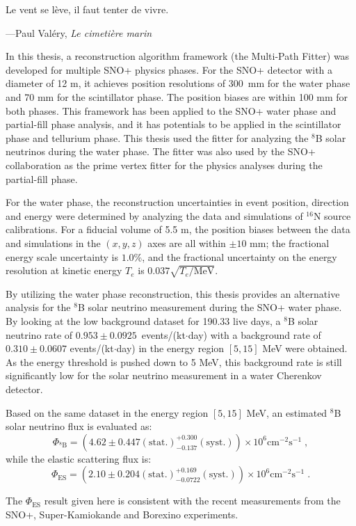 \epigraph{Le vent se l\`{e}ve, il faut tenter de vivre.}{---\textup{Paul Val\'{e}ry, \textit{Le cimeti\`{e}re marin}}}

In this thesis, a reconstruction algorithm framework (the Multi-Path Fitter) was developed for multiple SNO+ physics phases. For the SNO+ detector with a diameter of 12 m, it achieves position resolutions of 300~mm for the water phase and 70 mm for the scintillator phase. The position biases are within 100 mm for both phases. This framework has been applied to the SNO+ water phase and partial-fill phase analysis, and it has potentials to be applied in the scintillator phase and tellurium phase. This thesis used the fitter for analyzing the $^8$B solar neutrinos during the water phase. The fitter was also used by the SNO+ collaboration as the prime vertex fitter for the physics analyses during the partial-fill phase.

For the water phase, the reconstruction uncertainties in event position, direction and energy were determined by analyzing the data and simulations of $^{16}$N source calibrations. For a fiducial volume of 5.5 m, the position biases between the data and simulations in the $(x,y,z)$ axes are all within $\pm10$ mm; the fractional energy scale uncertainty is $1.0$\%, and the fractional uncertainty on the energy resolution at kinetic energy $T_e$ is $0.037\sqrt{T_e/\mathrm{MeV}}$.

By utilizing the water phase reconstruction, this thesis provides an alternative analysis for the $^8$B solar neutrino measurement during the SNO+ water phase. By looking at the low background dataset for 190.33 live days, a $^8$B solar neutrino rate of $0.953\pm0.0925$~events/(kt$\cdot$day) with a background rate of $0.310\pm 0.0607$ events/(kt$\cdot$day) in the energy region $[5,15]$ MeV were obtained. As the energy threshold is pushed down to 5 MeV, this background rate is still significantly low for the solar neutrino measurement in a water Cherenkov detector.

Based on the same dataset in the energy region $[5,15]$ MeV, an estimated $^8$B solar neutrino flux is evaluated as: 
\begin{equation*}
\Phi_{\mathrm{^8B}}=(4.62 \pm 0.447 \mathrm{(stat.)}^{+0.300}_{-0.137}\mathrm{(syst.)})\times 10^6 \mathrm{cm}^{-2}\mathrm{s}^{-1}\;, 
\end{equation*}
while the elastic scattering flux is:
\begin{equation*}
\Phi_{\mathrm{ES}}=(2.10 \pm 0.204\mathrm{(stat.)}^{+0.169}_{-0.0722}\mathrm{(syst.)})\times 10^6 \mathrm{cm}^{-2}\mathrm{s}^{-1}\;.
\end{equation*}

The $\Phi_{\mathrm{ES}}$ result given here is consistent with the recent measurements from the SNO+, Super-Kamiokande and Borexino experiments.